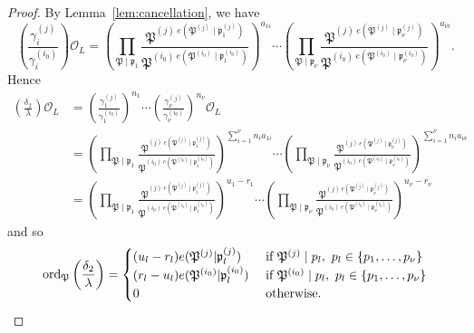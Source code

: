 \begin{proof}

By Lemma~\ref{lem:cancellation}, we have 
\[\left( \frac{\gamma_i^{(j)}}{\gamma_i^{(i_0)}}\right)\mathcal{O}_L 
	 = \left(\prod_{\mathfrak{P}\mid\mathfrak{p}_1} \frac{\mathfrak{P}^{(j) \ e(\mathfrak{P}^{(j)}\mid\mathfrak{p}_1^{(j)})}}{\mathfrak{P}^{(i_0) \ e(\mathfrak{P}^{(i_0)}\mid\mathfrak{p}^{(i_0)}_1)}}\right)^{a_{1i}} \cdots \left(\prod_{\mathfrak{P}\mid\mathfrak{p}_{\nu}} \frac{\mathfrak{P}^{(j) \ e(\mathfrak{P}^{(j)}\mid\mathfrak{p}^{(j)}_{\nu})}}{\mathfrak{P}^{(i_0) \ e(\mathfrak{P}^{(i_0)}\mid\mathfrak{p}^{(i_0)}_{\nu})}}\right)^{a_{\nu i}}.\]
Hence
\begin{align*}
\left(\frac{\delta_2}{\lambda}\right)\mathcal{O}_L
	& = \left( \frac{\gamma_1^{(j)}}{\gamma_1^{(i_0)}}\right)^{n_1}\cdots \left( \frac{\gamma_{\nu}^{(j)}}{\gamma_{\nu}^{(i_0)}}\right)^{n_{\nu}} \mathcal{O}_L\\
	& = \left(\prod_{\mathfrak{P}\mid\mathfrak{p}_1} \frac{\mathfrak{P}^{(j) \ e(\mathfrak{P}^{(j)}\mid\mathfrak{p}_1^{(j)})}}{\mathfrak{P}^{(i_0) \ e(\mathfrak{P}^{(i_0)}\mid\mathfrak{p}^{(i_0)}_1)}}\right)^{\sum_{i = 1}^\nu n_ia_{1i}} \cdots \left(\prod_{\mathfrak{P}\mid\mathfrak{p}_{\nu}} \frac{\mathfrak{P}^{(j) \ e(\mathfrak{P}^{(j)}\mid\mathfrak{p}^{(j)}_{\nu})}}{\mathfrak{P}^{(i_0) \ e(\mathfrak{P}^{(i_0)}\mid\mathfrak{p}^{(i_0)}_{\nu})}}\right)^{\sum_{i=1}^{\nu} n_ia_{\nu i}}\\
	& = \left(\prod_{\mathfrak{P}\mid\mathfrak{p}_1} \frac{\mathfrak{P}^{(j) \ e(\mathfrak{P}^{(j)}\mid\mathfrak{p}_1^{(j)})}}{\mathfrak{P}^{(i_0) \ e(\mathfrak{P}^{(i_0)}\mid\mathfrak{p}^{(i_0)}_1)}}\right)^{u_1 - r_1} \cdots \left(\prod_{\mathfrak{P}\mid\mathfrak{p}_{\nu}} \frac{\mathfrak{P}^{(j) \ e(\mathfrak{P}^{(j)}\mid\mathfrak{p}^{(j)}_{\nu})}}{\mathfrak{P}^{(i_0) \ e(\mathfrak{P}^{(i_0)}\mid\mathfrak{p}^{(i_0)}_{\nu})}}\right)^{u_{\nu} - r_{\nu}}
\end{align*}
and so
\[\operatorname{ord}_{\mathfrak{P}}\left( \frac{\delta_2}{\lambda}\right)=
\begin{cases}
(u_l - r_l)e(\mathfrak{P}^{(j)}|\mathfrak{p}_l^{(j)})	
	& \textnormal{ if } \mathfrak{P}^{(j)} \mid p_l , \ p_l \in \{p_1,\dots, p_{\nu}\}\\
(r_l - u_l)e(\mathfrak{P}^{(i_0)}|\mathfrak{p}_l^{(i_0)})
	& \textnormal{ if } \mathfrak{P}^{(i_0)}\mid p_l, \ p_l \in \{p_1,\dots, p_{\nu}\}\\
0 	& \textnormal{ otherwise}.
\end{cases}\]
\end{proof}

